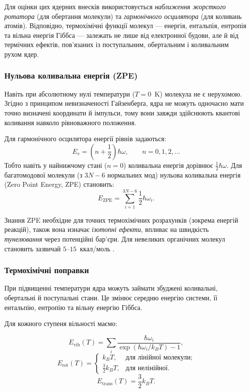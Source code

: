 {Для оцінки цих ядерних внесків використовується
\emph{наближення жорсткого ротатора} (для обертання молекули)
та \emph{гармонічного осцилятора} (для коливань атомів).
Відповідно, термохімічні функції молекул —
енергія, ентальпія, ентропія та вільна енергія Гіббса —
залежать не лише від електронної будови, але й від термічних ефектів,
пов’язаних із поступальним, обертальним і коливальним рухом ядер.



\subsubsection{Нульова коливальна енергія (ZPE)}

Навіть при абсолютному нулі температури ($T=0$~K) молекула не є нерухомою.
Згідно з принципом невизначеності Гайзенберґа, ядра не можуть одночасно
мати точно визначені координати й імпульси, тому вони завжди здійснюють
квантові коливання навколо рівноважного положення.

Для гармонічного осцилятора енергії рівнів задаються:
\[
E_v = \left(n + \frac{1}{2}\right)\hbar\omega, \qquad n = 0, 1, 2, \ldots
\]
Тобто навіть у найнижчому стані ($n=0$) коливальна енергія дорівнює
$\tfrac{1}{2}\hbar\omega$.
Для багатомодової молекули (з $3N-6$ нормальних мод)
нульова коливальна енергія (Zero Point Energy, ZPE) становить:
\[
E_{\text{ZPE}} = \sum_{i=1}^{3N-6} \frac{1}{2}\hbar\omega_i.
\]

Знання ZPE необхідне для точних термохімічних розрахунків (зокрема енергій реакцій), також вона изначає \emph{ізотопні ефекти}, впливає на швидкість \emph{тунелювання} через потенційні бар’єри. Для невеликих органічних молекул становить зазвичай $5$–$15$~ккал/моль .


\subsubsection{Термохімічні поправки}

При підвищенні температури ядра можуть займати збуджені коливальні,
обертальні й поступальні стани. Це змінює середню енергію системи,
її ентальпію, ентропію та вільну енергію Гіббса.

Для кожного ступеня вільності маємо:

\begin{equation*}
    E_{\text{vib}}(T) = \sum_i \frac{\hbar\omega_i}{\exp(\hbar\omega_i/k_BT) - 1},
\end{equation*}
\begin{equation*}
    E_{\text{rot}}(T) =
    \begin{cases}
        k_BT, & \text{для лінійної молекули;} \\
        \frac{3}{2}k_BT, & \text{для нелінійної.}
    \end{cases}
\end{equation*}
\begin{equation*}
    E_{\text{trans}}(T) = \frac{3}{2}k_BT.
\end{equation*}

}
